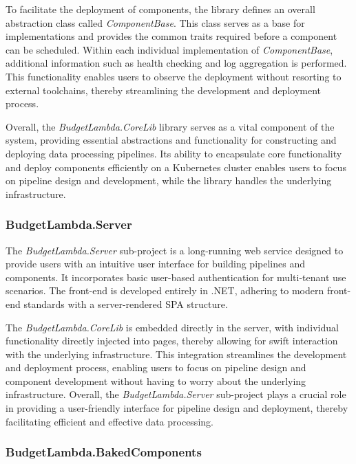 \documentclass[fleqn,10pt]{SelfArx} %
\begin{document}
To facilitate the deployment of components, the library defines an overall abstraction class called \emph{ComponentBase}. This class serves as a base for implementations and provides the common traits required before a component can be scheduled. Within each individual implementation of \emph{ComponentBase}, additional information such as health checking and log aggregation is performed. This functionality enables users to observe the deployment without resorting to external toolchains, thereby streamlining the development and deployment process.

Overall, the \emph{BudgetLambda.CoreLib} library serves as a vital component of the system, providing essential abstractions and functionality for constructing and deploying data processing pipelines. Its ability to encapsulate core functionality and deploy components efficiently on a Kubernetes cluster enables users to focus on pipeline design and development, while the library handles the underlying infrastructure.

\subsubsection{BudgetLambda.Server}

The \emph{BudgetLambda.Server} sub-project is a long-running web service designed to provide users with an intuitive user interface for building pipelines and components. It incorporates basic user-based authentication for multi-tenant use scenarios. The front-end is developed entirely in .NET, adhering to modern front-end standards with a server-rendered SPA structure.

The \emph{BudgetLambda.CoreLib} is embedded directly in the server, with individual functionality directly injected into pages, thereby allowing for swift interaction with the underlying infrastructure. This integration streamlines the development and deployment process, enabling users to focus on pipeline design and component development without having to worry about the underlying infrastructure. Overall, the \emph{BudgetLambda.Server} sub-project plays a crucial role in providing a user-friendly interface for pipeline design and deployment, thereby facilitating efficient and effective data processing.

\subsubsection{BudgetLambda.BakedComponents}
\end{document}
